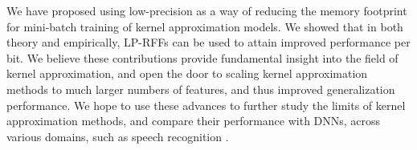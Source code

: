 We have proposed using low-precision as a way of reducing the memory footprint for mini-batch training of kernel approximation models. We showed that in both theory and empirically, LP-RFFs can be used to attain improved performance per bit. We believe these contributions provide fundamental insight into the field of kernel approximation, and open the door to scaling kernel approximation methods to much larger numbers of features, and thus improved generalization performance. We hope to use these advances to further study the limits of kernel approximation methods, and compare their performance with DNNs, across various domains, such as speech recognition \citep{may2017}.

